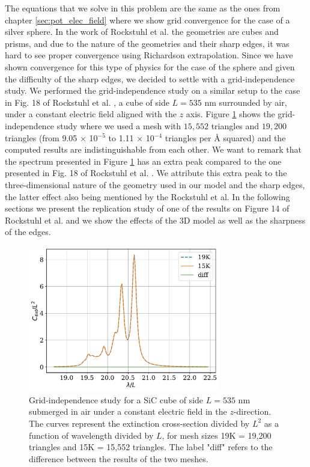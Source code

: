 The equations that we solve in this problem are the same as the ones from chapter \ref{sec:pot_elec_field} where we show grid convergence for the case of 
a silver sphere. In the work of Rockstuhl et al. \cite{rockstuhl2005} the geometries are cubes and prisms, and due to the nature of the geometries 
and their sharp edges, it was hard to see proper convergence using Richardson extrapolation. Since we have shown convergence for this type of physics
for the case of the sphere and given the difficulty of the sharp edges, we decided to settle with a grid-independence study. We performed the grid-independence study
on a similar setup to the case in Fig. 18 of Rockstuhl et al. \cite{rockstuhl2005}, a cube of side $L=535$ nm surrounded by air, under a constant electric field 
aligned with the $z$ axis. Figure \ref{fig:cube535} shows the grid-independence study where we used a mesh with $15,552$ triangles and $19,200$ triangles 
(from 9.05 $\times$ 10$^{-5}$ to 1.11 $\times$ 10$^{-4}$ triangles per $\text{\AA}$ squared) and the computed results are indistinguishable from each other.
We want to remark that the spectrum presented in Figure \ref{fig:cube535} has an extra peak compared to the one presented in Fig. 18 of Rockstuhl
et al. \cite{rockstuhl2005}. We attribute this extra peak to the three-dimensional nature of the geometry used in our model and the sharp edges, the
latter effect also being mentioned by the Rockstuhl et al. In the following sections we present the replication study of one of the results on 
Figure 14 of Rockstuhl et al. and we show the effects of the 3D model as well as the sharpness of the edges. 

\begin{figure}
    \centering
    \includegraphics[width=0.75\textwidth]{cubeL535nm_15Kvs19K.pdf} 
    \caption{Grid-independence study for a SiC cube of side $L=535$ nm submerged in air under a constant 
    electric field in the $z$-direction. The curves represent the extinction cross-section divided by $L^2$ 
    as a function of wavelength divided by $L$, for mesh sizes 19K = 19,200 triangles and 15K = 15,552 triangles. 
    The label "diff" refers to the difference between the results of the two meshes.}
    \label{fig:cube535}
 \end{figure}

